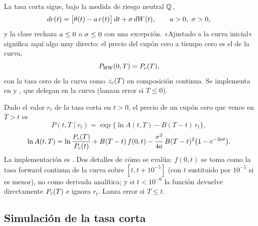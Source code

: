 La tasa corta sigue, bajo la medida de riesgo neutral $\mathbb{Q}$,
\begin{equation}\label{eq:cap05-dinamica}
  dr(t) = \bigl[\theta(t) - a\, r(t)\bigr]\,dt + \sigma\, dW(t),\qquad a>0,\ \sigma>0,
\end{equation}
y la clase  rechaza $a\le0$ o $\sigma\le0$ con una
excepción. «Ajustado a la curva inicial» significa aquí algo muy directo: el precio del cupón cero a
tiempo cero es el de la curva,
\begin{equation}\label{eq:cap05-ajuste}
  P_{\mathrm{HW}}(0,T) = P_{c}(T),
\end{equation}
con la tasa cero de la curva como $z_{c}(T)$ en composición continua. Se implementa en
 y
, que delegan en la curva (lanzan error si $T\le0$).

Dado el valor $r_t$ de la tasa corta en $t>0$, el precio de un cupón cero que vence en $T>t$ es
\begin{equation}\label{eq:cap05-cupon-condicional}
  P(t,T\mid r_t) = \exp\bigl\{\ln A(t,T) - B(T-t)\,r_t\bigr\},
\end{equation}
\begin{equation}\label{eq:cap05-lnA}
  \ln A(t,T) = \ln\frac{P_{c}(T)}{P_{c}(t)} + B(T-t)\,f(0,t)
  - \frac{\sigma^{2}}{4a}\,B(T-t)^{2}\bigl(1-e^{-2a t}\bigr).
\end{equation}
La implementación es . Dos detalles de
cómo se evalúa: $f(0,t)$ se toma como la tasa forward continua de la curva sobre $[t,t+10^{-5}]$ (con
$t$ sustituido por $10^{-5}$ si es menor), no como derivada analítica; y si $t<10^{-6}$ la función devuelve
directamente $P_{c}(T)$ e ignora $r_t$. Lanza error si $T\le t$.

\subsection{Simulación de la tasa corta}\label{sec:cap05-simulacion}

